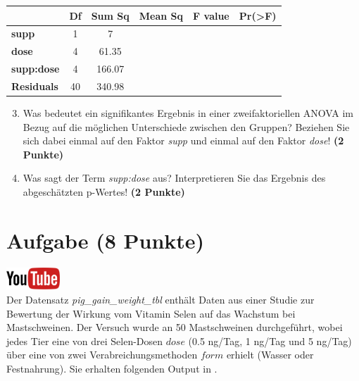 \documentclass[a4paper, 10pt]{scrartcl}\usepackage[]{graphicx}\usepackage[]{xcolor}
\begin{document}
\vspace{1Ex}

\begin{center}
  \Large
  \begin{tabular}{l|c|c|c|c|c}
     & \textbf{Df} & \textbf{Sum Sq} & \textbf{Mean Sq} & \textbf{F value} & \textbf{Pr(>F)} \strut\\
    \hline
   \textbf{supp}  & 1 & 7 &  &  &  \strut\\
    \hline
    \textbf{dose}  & 4 & 61.35 &  &  &  \strut\\
    \hline
    \textbf{supp:dose}  & 4 & 166.07 &  &  &  \strut\\
    \hline
   \textbf{Residuals}  & 40 & 340.98 &  &  &  \strut\\
  \end{tabular}
\end{center}

\vspace{1Ex}

\begin{enumerate}
  \setcounter{enumi}{2}
\item Was bedeutet ein signifikantes Ergebnis in einer zweifaktoriellen
  ANOVA im Bezug auf die m{\"o}glichen Unterschiede zwischen den Gruppen?
  Beziehen Sie sich dabei einmal auf den Faktor \textit{supp} und einmal
  auf den Faktor \textit{dose}! \textbf{(2 Punkte)}
\item Was sagt der Term \textit{supp:dose} aus? Interpretieren Sie das
  Ergebnis des abgesch{\"a}tzten p-Wertes! \textbf{(2 Punkte)}
\end{enumerate}
 
\clearpage

\section{Aufgabe \hfill (8 Punkte)}

\hfill\href{https://youtu.be/rWTyHXXlYjY}{\includegraphics[width =
  2cm]{img/youtube}}\\[1Ex]


Der Datensatz \textit{pig\_gain\_weight\_tbl} enth{\"a}lt Daten aus einer Studie zur Bewertung
der Wirkung vom Vitamin Selen auf das Wachstum bei Mastschweinen. Der
Versuch wurde an 50 Mastschweinen durchgef{\"u}hrt, wobei
jedes Tier eine von drei Selen-Dosen $dose$ (0.5 ng/Tag, 1 ng/Tag und 5 ng/Tag)
{\"u}ber eine von zwei Verabreichungsmethoden $form$ erhielt (Wasser oder
Festnahrung). Sie erhalten folgenden Output in \Rlogo.
\end{document}
